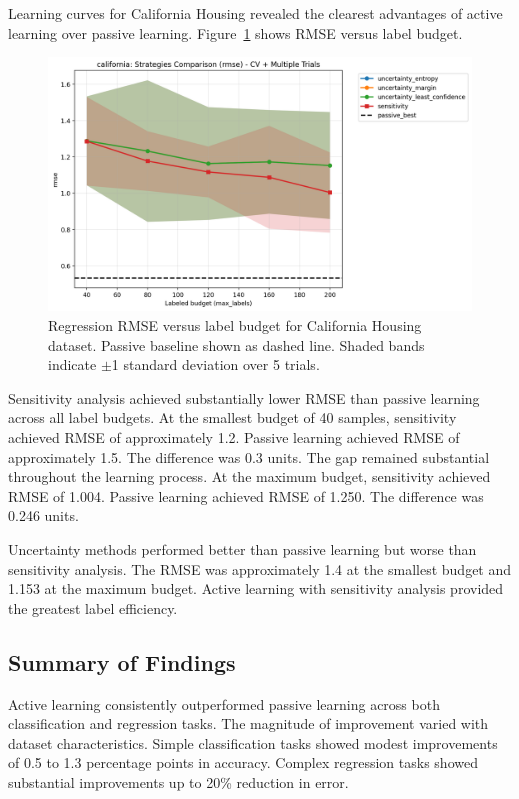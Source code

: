 \documentclass[conference]{IEEEtran}
\begin{document}
Learning curves for California Housing revealed the clearest advantages of active learning over passive learning. Figure~\ref{fig:california-compare} shows RMSE versus label budget.

\begin{figure}[t]
\centering
\includegraphics[width=0.95\columnwidth]{figures/reg_california_comparison_rmse.png}
\caption{Regression RMSE versus label budget for California Housing dataset. Passive baseline shown as dashed line. Shaded bands indicate $\pm$1 standard deviation over 5 trials.}
\label{fig:california-compare}
\end{figure}

Sensitivity analysis achieved substantially lower RMSE than passive learning across all label budgets. At the smallest budget of 40 samples, sensitivity achieved RMSE of approximately 1.2. Passive learning achieved RMSE of approximately 1.5. The difference was 0.3 units. The gap remained substantial throughout the learning process. At the maximum budget, sensitivity achieved RMSE of 1.004. Passive learning achieved RMSE of 1.250. The difference was 0.246 units.

Uncertainty methods performed better than passive learning but worse than sensitivity analysis. The RMSE was approximately 1.4 at the smallest budget and 1.153 at the maximum budget. Active learning with sensitivity analysis provided the greatest label efficiency.

\subsection{Summary of Findings}

Active learning consistently outperformed passive learning across both classification and regression tasks. The magnitude of improvement varied with dataset characteristics. Simple classification tasks showed modest improvements of 0.5 to 1.3 percentage points in accuracy. Complex regression tasks showed substantial improvements up to 20\% reduction in error.
\end{document}
